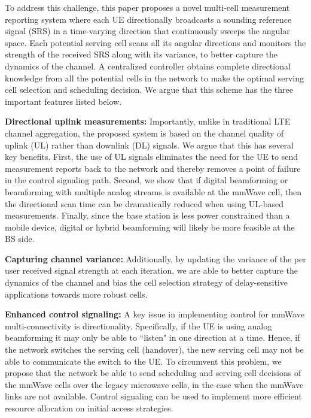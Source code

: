 \documentclass[conference,a4paper]{IEEEtran}
\begin{document}
To address this challenge, this paper proposes a novel multi-cell
measurement reporting system 
where each UE
 directionally broadcasts a sounding reference signal (SRS) in a time-varying direction that continuously
 sweeps the angular space. Each potential serving cell scans all its angular directions
 and monitors the strength of the received SRS along with its variance, to better capture the dynamics of the channel. A centralized controller obtains complete directional knowledge from all the potential cells
 in the network to make the optimal serving cell selection and
 scheduling decision.  We argue that this scheme has the three important features listed below.

 

\textbf{Directional uplink measurements:} Importantly, unlike in
traditional LTE channel aggregation, the proposed system is based on
the channel quality of uplink (UL) rather than downlink (DL) signals. We argue that this has several key benefits. First, 
the use of UL signals eliminates the need for the UE
to send measurement reports back to the network and thereby removes a point of failure in the control
signaling path.
Second, we show that if digital beamforming or beamforming with multiple analog streams
is available at the mmWave cell, then the
directional scan time can be dramatically reduced when using UL-based
measurements.  
Finally, since the base station is less power constrained
than a mobile device, digital or hybrid beamforming will likely be more feasible
at the BS side.

\textbf{Capturing channel variance:} Additionally, by updating the variance of the per user received signal strength at each iteration, we are able to better capture the dynamics of the channel and bias the cell selection strategy of delay-sensitive applications towards more robust cells.

\textbf{Enhanced control signaling:} A key issue in implementing control for
mmWave multi-connectivity is directionality.  Specifically, if the UE is using
analog beamforming it may only be able to ``listen" in one direction at a time.
Hence, if the network switches the serving cell (handover), the new serving cell may not be able
to communicate the switch to the UE.  To circumvent this problem, we propose
that the network be able to send scheduling and serving cell decisions of the mmWave cells
over the legacy microwave cells, in the case when the mmWave links are not available.
Control signaling can be used to implement more efficient resource allocation on initial access strategies.
\end{document}
